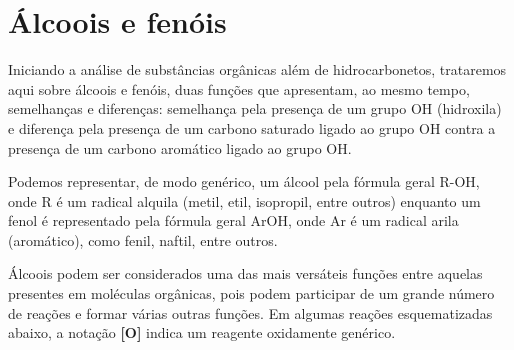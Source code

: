 \chapter{Álcoois e fenóis}
Iniciando a análise de substâncias orgânicas além de hidrocarbonetos, trataremos aqui sobre álcoois e fenóis, duas funções que apresentam, ao mesmo tempo, semelhanças e diferenças: semelhança pela presença de um grupo OH (hidroxila) e diferença pela presença de um carbono saturado ligado ao grupo OH contra a presença de um carbono aromático ligado ao grupo OH.

Podemos representar, de modo genérico, um álcool pela fórmula geral R-OH, onde R é um radical alquila (metil, etil, isopropil, entre outros) enquanto um fenol é representado pela fórmula geral ArOH, onde Ar é um radical arila (aromático), como fenil, naftil, entre outros.

Álcoois podem ser considerados uma das mais versáteis funções entre aquelas presentes em moléculas orgânicas, pois podem participar de um grande número de reações e formar várias outras funções. Em algumas reações esquematizadas abaixo, a notação \textbf{[O]} indica um reagente oxidamente genérico.

